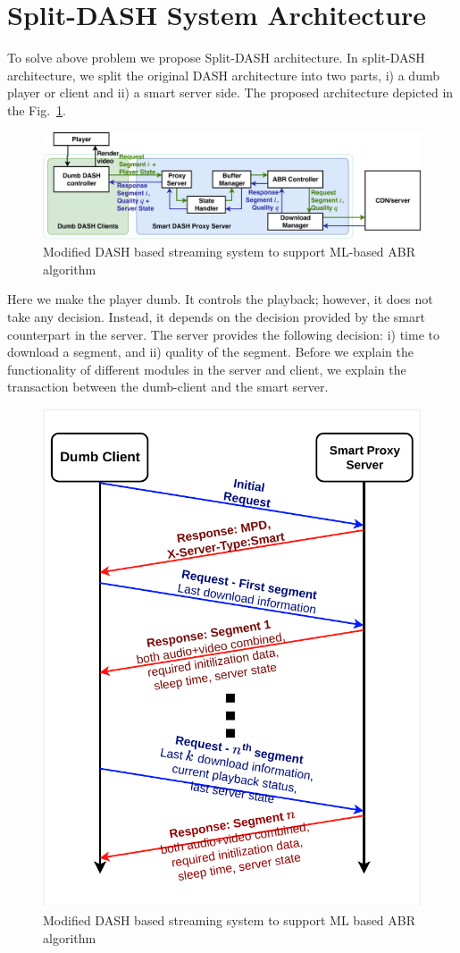 \section{Split-DASH System Architecture}
\label{sec:Split_DASH_architecture}
To solve above problem we propose Split-DASH architecture. In split-DASH architecture, we split the original DASH architecture into two parts, i) a dumb player or client and ii) a smart server side. The proposed architecture depicted in the Fig.~\ref{fig:playerDiagram_split}.
\begin{figure}[ht]
	\begin{center}
		\includegraphics[width=0.9\linewidth]{img/playerDiagram_split}
	\end{center}
	\caption{\label{fig:playerDiagram_split} Modified DASH based streaming system to support ML-based ABR algorithm}
\end{figure}
Here we make the player dumb. It controls the playback; however, it does not take any decision. Instead, it depends on the decision provided by the smart counterpart in the server. The server provides the following decision: i) time to download a segment, and ii) quality of the segment. Before we explain the functionality of different modules in the server and client, we explain the transaction between the dumb-client and the smart server. 

\begin{figure}[h]
	\begin{center}
		\includegraphics[width=0.5\linewidth]{img/splitDASHTransaction}
	\end{center}
	\caption{\label{fig:splitDASHTransaction} Modified DASH based streaming system to support ML based ABR algorithm}
\end{figure}

